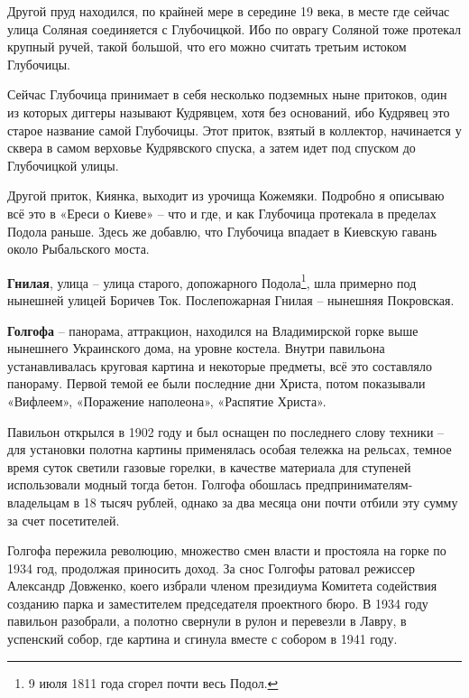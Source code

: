 Другой пруд находился, по крайней мере в середине 19 века, в месте где сейчас улица Соляная соединяется с Глубочицкой. Ибо по оврагу Соляной тоже протекал крупный ручей, такой большой, что его можно считать третьим истоком Глубочицы.

Сейчас Глубочица принимает в себя несколько подземных ныне притоков, один из которых диггеры называют Кудрявцем, хотя без оснований, ибо Кудрявец это старое название самой Глубочицы. Этот приток, взятый в коллектор, начинается у сквера в самом верховье Кудрявского спуска, а затем идет под спуском до Глубочицкой улицы.

Другой приток, Киянка, выходит из урочища Кожемяки. Подробно я описываю всё это в «Ереси о Киеве» – что и где, и как Глубочица протекала в пределах Подола раньше. Здесь же добавлю, что Глубочица впадает в Киевскую гавань около Рыбальского моста.\\

\medskip

\textbf{Гнилая}, улица – улица старого, допожарного Подола\footnote{9 июля 1811 года сгорел почти весь Подол.}, шла примерно под нынешней улицей Боричев Ток. Послепожарная Гнилая – нынешняя Покровская.\\

\medskip

\textbf{Голгофа} – панорама, аттракцион, находился на Владимирской горке выше нынешнего Украинского дома, на уровне костела. Внутри павильона устанавливалась круговая картина и некоторые предметы, всё это составляло панораму. Первой темой ее были последние дни Христа, потом показывали «Вифлеем», «Поражение наполеона», «Распятие Христа».

Павильон открылся в 1902 году и был оснащен по последнего слову техники – для установки полотна картины применялась особая тележка на рельсах, темное время суток светили газовые горелки, в качестве материала для ступеней использовали модный тогда бетон. Голгофа обошлась предпринимателям-владельцам в 18 тысяч рублей, однако за два месяца они почти отбили эту сумму за счет посетителей.

Голгофа пережила революцию, множество смен власти и простояла на горке по 1934 год, продолжая приносить доход. За снос Голгофы ратовал режиссер Александр Довженко, коего избрали членом президиума Комитета содействия созданию парка и заместителем председателя проектного бюро. В 1934 году павильон разобрали, а полотно свернули в рулон и перевезли в Лавру, в успенский собор, где картина и сгинула вместе с собором в 1941 году.\\

